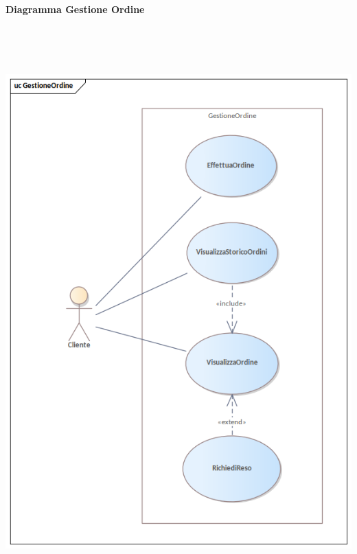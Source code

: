 \newpage\paragraph{Diagramma Gestione Ordine}\mbox{}\\
\begin{center}
  \includegraphics[width=\textwidth, height=20cm, keepaspectratio]{immagini/GestioneDeiRequisiti/GestioneOrdine.png}
\end{center}

\newpage
